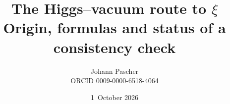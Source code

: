 \documentclass[11pt,a4paper]{report}
\title{The Higgs--vacuum route to $\xi$\\[0.5em]
  \large Origin, formulas and status of a consistency check}
\date{1~October 2026}
\author{Johann Pascher\\\small ORCID 0009-0000-6518-4064}
\begin{document}
\renewcommand{\thechapter}{}
\renewcommand{\thesection}{\arabic{section}}
\maketitle
\tableofcontents

\end{document}

